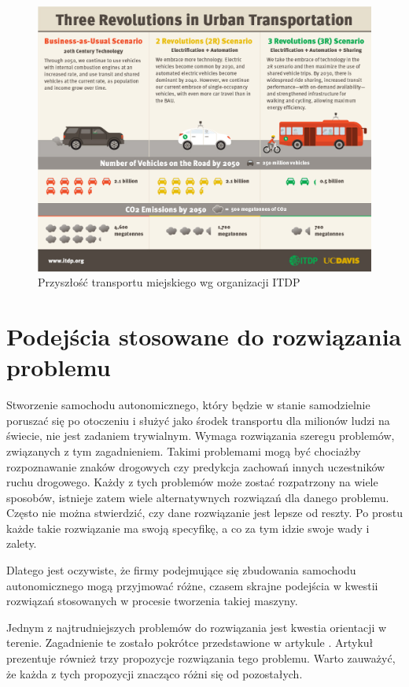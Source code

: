 \begin{figure}[h]
\begin{center}
\includegraphics[width=15cm]{resources/figures/itdp_infographic.jpg}
\caption{Przyszłość transportu miejskiego wg organizacji ITDP}
\label{IdtpTransportFuture}
\end{center}
\end{figure}

\section{Podejścia stosowane do rozwiązania problemu}
Stworzenie samochodu autonomicznego, który będzie w stanie samodzielnie poruszać się po otoczeniu i służyć jako środek transportu dla milionów ludzi na świecie, nie jest zadaniem trywialnym. Wymaga rozwiązania szeregu problemów, związanych z tym zagadnieniem. Takimi problemami mogą być chociażby rozpoznawanie znaków drogowych czy predykcja zachowań innych uczestników ruchu drogowego. Każdy z tych problemów może zostać rozpatrzony na wiele sposobów, istnieje zatem wiele alternatywnych rozwiązań dla danego problemu. Często nie można stwierdzić, czy dane rozwiązanie jest lepsze od reszty. Po prostu każde takie rozwiązanie ma swoją specyfikę, a co za tym idzie swoje wady i zalety.

Dlatego jest oczywiste, że firmy podejmujące się zbudowania samochodu autonomicznego mogą przyjmować różne, czasem skrajne podejścia w kwestii rozwiązań stosowanych w procesie tworzenia takiej maszyny.

Jednym z najtrudniejszych problemów do rozwiązania jest kwestia orientacji w terenie. Zagadnienie te zostało pokrótce przedstawione w artykule \cite{threeApproachesToOrientation}.
Artykuł prezentuje również trzy propozycje rozwiązania tego problemu. Warto zauważyć, że każda z tych propozycji znacząco różni się od pozostałych.

